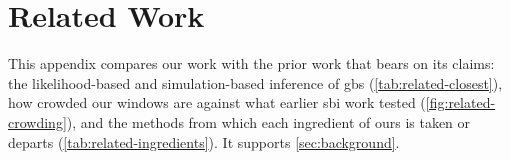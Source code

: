 \section{Related Work}
\label{app:related}

This appendix compares our work with the prior work that bears on its claims: the
likelihood-based and simulation-based inference of \acp{gb} (\cref{tab:related-closest}), how crowded
our windows are against what earlier \acs{sbi} work tested (\cref{fig:related-crowding}), and the
methods from which each ingredient of ours is taken or departs (\cref{tab:related-ingredients}).
It supports \cref{sec:background}.

